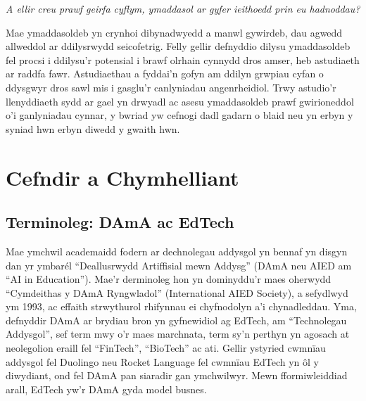 \textit{A ellir creu prawf geirfa cyflym, ymaddasol ar gyfer ieithoedd prin eu hadnoddau?}

Mae ymaddasoldeb yn crynhoi dibynadwyedd a manwl gywirdeb, dau agwedd allweddol ar ddilysrwydd seicofetrig. Felly gellir defnyddio dilysu ymaddasoldeb fel procsi i ddilysu'r potensial i brawf olrhain cynnydd dros amser, heb astudiaeth ar raddfa fawr. Astudiaethau a fyddai'n gofyn am ddilyn grwpiau cyfan o ddysgwyr dros sawl mis i gasglu'r canlyniadau angenrheidiol. Trwy astudio'r llenyddiaeth sydd ar gael yn drwyadl ac asesu ymaddasoldeb prawf gwirioneddol o'i ganlyniadau cynnar, y bwriad yw cefnogi dadl gadarn o blaid neu yn erbyn y syniad hwn erbyn diwedd y gwaith hwn.

\section{Cefndir a Chymhelliant}
\subsection{Terminoleg: DAmA ac EdTech}
Mae ymchwil academaidd fodern ar dechnolegau addysgol yn bennaf yn disgyn dan yr ymbarél ``Deallusrwydd Artiffisial mewn Addysg'' (DAmA neu AIED am ``AI in Education''). Mae'r derminoleg hon yn dominyddu'r maes oherwydd ``Cymdeithas y DAmA Ryngwladol'' (International AIED Society), a sefydlwyd ym 1993, ac effaith strwythurol rhifynnau ei chyfnodolyn a'i chynadleddau. Yma, defnyddir DAmA ar brydiau bron yn gyfnewidiol ag EdTech, am ``Technolegau Addysgol'', sef term mwy o'r maes marchnata, term sy’n perthyn yn agosach at neolegolion eraill fel ``FinTech'', ``BioTech'' ac ati. Gellir ystyried cwmnïau addysgol fel Duolingo neu Rocket Language fel cwmnïau EdTech yn ôl y diwydiant, ond fel DAmA pan siaradir gan ymchwilwyr. Mewn fformiwleiddiad arall, EdTech yw'r DAmA gyda model busnes.

